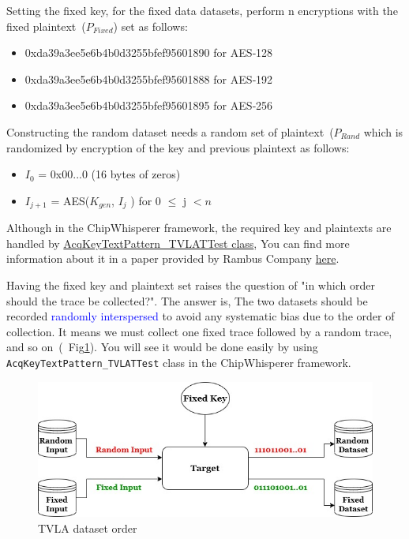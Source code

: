 \documentclass[11pt]{article}
\newcommand{\inBlue}[1]{\textcolor{blue}{#1}}
\newcommand{\inRed}[1]{\textcolor{myred}{#1}}
\newcommand{\inGreen}[1]{\textcolor{ao}{#1}}
\begin{document}
\noindent Setting the fixed key, for the fixed data datasets, perform n encryptions with the fixed plaintext~({$P_{Fixed}$}) set as follows: 

\begin{itemize}
    \item 0xda39a3ee5e6b4b0d3255bfef95601890 \inGreen{for AES‐128}
    \item 0xda39a3ee5e6b4b0d3255bfef95601888 \inGreen{for AES‐192}
    \item 0xda39a3ee5e6b4b0d3255bfef95601895 \inGreen{for AES‐256}
\end{itemize}

\noindent Constructing the random dataset needs a random set of plaintext~(\texttt{$P_{Rand}$} which is randomized by encryption of the key and previous plaintext as follows: 

\begin{itemize}
    \item $I_0$ = 0x00...0  \inGreen{(16 bytes of zeros)}
    \item $I_{j+1}$ = AES($K_{gen}$, $I_j$ ) for 0 $\leq$ j $< n$
\end{itemize}

Although in the ChipWhisperer framework, the required key and plaintexts are handled by \href{https://chipwhisperer.readthedocs.io/en/latest/capture-api.html#tvla-ttest}{AcqKeyTextPattern\_TVLATTest class}, You can find more information about it in a paper provided by Rambus Company \href{https://www.rambus.com/test-vector-leakage-assessment-tvla-derived-test-requirements-dtr-with-aes/}{here}. 

\noindent Having the fixed key and plaintext set raises the question of "in which order should the trace be collected?". The answer is, The two datasets should be recorded \inBlue{randomly interspersed} to avoid any \inRed{systematic bias} due to the order of collection. 
It means we must collect one fixed trace followed by a random trace, and so on~(~Fig\ref{fig:TVLA-Dataset}). You will see it would be done easily by using \texttt{AcqKeyTextPattern\_TVLATTest} class in the ChipWhisperer framework.

\begin{figure}[]
    \centering
    \includegraphics[scale=0.65]{TVLA-FI-Images/TVLA_dataset.jpg}
    \caption{TVLA dataset order}
    \label{fig:TVLA-Dataset}
\end{figure}
\end{document}
